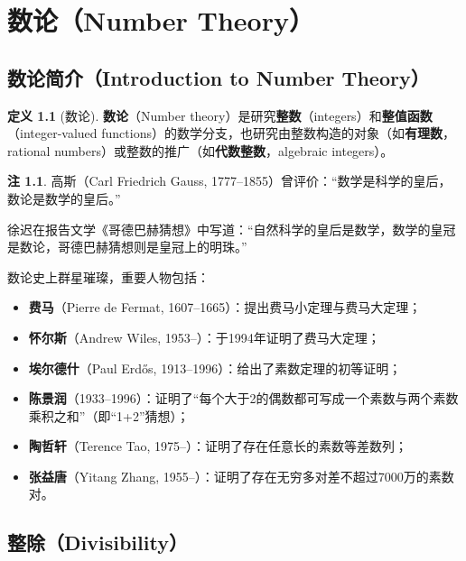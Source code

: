 \documentclass[UTF8,11pt,a4paper]{ctexbook}   %
\theoremstyle{definition}
\newtheorem{definition}{定义}[section]
\newtheorem{remark}{注}[section]
\begin{document}
\chapter{数论（Number Theory）}

\section{数论简介（Introduction to Number Theory）}

\begin{definition}[数论]
\textbf{数论}（Number theory）是研究\textbf{整数}（integers）和\textbf{整值函数}（integer-valued functions）的数学分支，也研究由整数构造的对象（如\textbf{有理数}，rational numbers）或整数的推广（如\textbf{代数整数}，algebraic integers）。
\end{definition}

\begin{remark}
高斯（Carl Friedrich Gauss, 1777--1855）曾评价：``数学是科学的皇后，数论是数学的皇后。''

徐迟在报告文学《哥德巴赫猜想》中写道：``自然科学的皇后是数学，数学的皇冠是数论，哥德巴赫猜想则是皇冠上的明珠。''
\end{remark}

数论史上群星璀璨，重要人物包括：
\begin{itemize}
    \item \textbf{费马}（Pierre de Fermat, 1607--1665）：提出费马小定理与费马大定理；
    \item \textbf{怀尔斯}（Andrew Wiles, 1953--）：于1994年证明了费马大定理；
    \item \textbf{埃尔德什}（Paul Erdős, 1913--1996）：给出了素数定理的初等证明；
    \item \textbf{陈景润}（1933--1996）：证明了``每个大于2的偶数都可写成一个素数与两个素数乘积之和''（即``1+2''猜想）；
    \item \textbf{陶哲轩}（Terence Tao, 1975--）：证明了存在任意长的素数等差数列；
    \item \textbf{张益唐}（Yitang Zhang, 1955--）：证明了存在无穷多对差不超过7000万的素数对。
\end{itemize}

\section{整除（Divisibility）}
\end{document}
